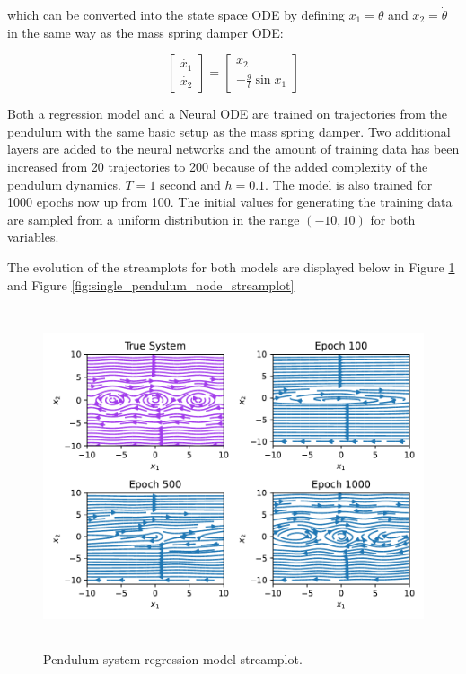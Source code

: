\documentclass[12pt,a4paper]{book}
\begin{document}
\noindent which can be converted into the state space ODE by defining $x_1 = \theta$ and $x_2 = \dot{\theta}$ in the same way as the mass spring damper ODE:

\begin{equation}
    \begin{bmatrix} \dot{x_1} \\ \dot{x_2} \end{bmatrix}
    = \begin{bmatrix} x_2 \\ - \frac{g}{l} \sin{x_1} \end{bmatrix}
    \label{eq:single_pendulum_ode}
\end{equation}

Both a regression model and a Neural ODE are trained on trajectories from the pendulum with the same basic setup as the mass spring damper. Two additional layers are added to the neural networks and the amount of training data has been increased from 20 trajectories to 200 because of the added complexity of the pendulum dynamics. $T = 1$ second and $h = 0.1$. The model is also trained for 1000 epochs now up from 100. The initial values for generating the training data are sampled from a uniform distribution in the range $(-10, 10)$ for both variables.

The evolution of the streamplots for both models are displayed below in Figure \ref{fig:single_pendulum_regressor_streamplot} and Figure \ref{fig:single_pendulum_node_streamplot}

\begin{figure}[H]
    \centering
    \includegraphics[height=10cm]{figs/plots/basic_experiments/single_pendulum_regressor_streamplot.pdf}
    \caption{Pendulum system regression model streamplot.}
    \label{fig:single_pendulum_regressor_streamplot}
\end{figure}
\end{document}
